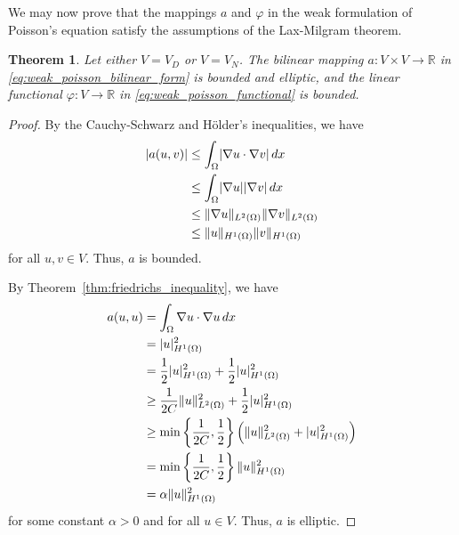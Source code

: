 \documentclass[english, 12pt, a4paper, sci, utf8, a-2b, online]{aaltothesis}
\theoremstyle{definition}
\theoremstyle{plain}
\newtheorem{theorem}{Theorem}[section]
\DeclarePairedDelimiter\abs{\lvert}{\rvert}
\DeclarePairedDelimiter\norm{\lVert}{\rVert}
\newcommand*\diff{\mathop{}\!d}
\numberwithin{equation}{section}
\begin{document}
We may now prove that the mappings $a$ and $\varphi$ in the weak formulation of Poisson's equation
satisfy the assumptions of the Lax-Milgram theorem.
\begin{theorem}
    \label{thm:weak_poisson_reqs_2_and_3}
    Let either $V = V_D$ or $V = V_N$.
    The bilinear mapping $a: V \times V \to \mathbb{R}$ in
    \eqref{eq:weak_poisson_bilinear_form} is bounded and elliptic,
    and the linear functional $\varphi: V \to \mathbb{R}$ in
    \eqref{eq:weak_poisson_functional} is bounded.
\end{theorem}
\begin{proof}
    By the Cauchy-Schwarz and Hölder's inequalities, we have
    \begin{align*}
        \abs{a(u,v)}
        &\leq \int_{\Omega} \abs{\nabla u \cdot \nabla v} \diff x \\
        &\leq \int_{\Omega} \abs{\nabla u} \abs{\nabla v} \diff x \\
        &\leq \norm{\nabla u}_{L^2(\Omega)} \norm{\nabla v}_{L^2(\Omega)} \\
        &\leq \norm{u}_{H^1(\Omega)} \norm{v}_{H^1(\Omega)}
    \end{align*}
    for all $u,v \in V$. Thus, $a$ is bounded.

    By Theorem~\ref{thm:friedrichs_inequality}, we have
    \begin{align*}
        a(u,u)
        &= \int_{\Omega} \nabla u \cdot \nabla u \diff x \\
        &= \abs{u}_{H^1(\Omega)}^2 \\
        &= \frac{1}{2} \abs{u}_{H^1(\Omega)}^2
            + \frac{1}{2} \abs{u}_{H^1(\Omega)}^2 \\
        &\geq \frac{1}{2C} \norm{u}_{L^2(\Omega)}^2
            + \frac{1}{2} \abs{u}_{H^1(\Omega)}^2 \\
        &\geq \min\left\{ \frac{1}{2C}, \frac{1}{2} \right\}
            \left( \norm{u}_{L^2(\Omega)}^2 + \abs{u}_{H^1(\Omega)}^2 \right) \\
        &= \min\left\{ \frac{1}{2C}, \frac{1}{2} \right\}
            \norm{u}_{H^1(\Omega)}^2 \\
        &= \alpha \norm{u}_{H^1(\Omega)}^2
    \end{align*}
    for some constant $\alpha > 0$ and for all $u \in V$. Thus, $a$ is elliptic.


\end{proof}
\end{document}
